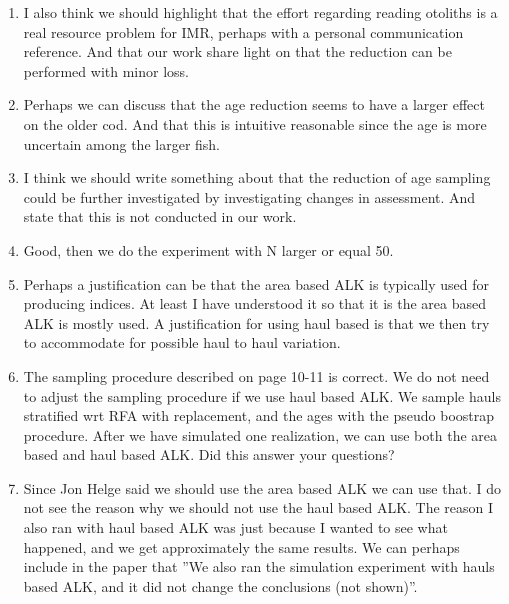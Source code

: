 \documentclass[a4paper 12pt]{article}
\numberwithin{equation}{section}
\begin{document}
\begin{enumerate}
\item I also think we should highlight that the effort regarding reading otoliths is a real resource problem for IMR, perhaps with a personal communication reference.  And that our work share light on that the reduction can be performed with minor loss.

\item Perhaps we can discuss that the age reduction seems to have a larger effect on the older cod. And that this is intuitive reasonable since the age is more uncertain among the larger fish.

\item I think we should write something about that the reduction of age sampling could be further investigated by investigating changes in assessment. And state that this is not conducted in our work. 

\item Good, then we do the experiment with N larger or equal 50.

\item Perhaps a justification can be that the area based ALK is typically used for producing indices. At least I have understood it so that it is the area based ALK is mostly used. A justification for using haul based is that we then try to accommodate for possible haul to haul variation.

\item The sampling procedure described on page 10-11 is correct. We do not need to adjust the sampling procedure if we use haul based ALK. We sample hauls stratified wrt RFA with replacement, and the ages with the pseudo boostrap procedure. After we have simulated one realization, we can use both the area based and haul based ALK. Did this answer your questions?

\item Since Jon Helge said we should use the area based ALK we can use that. I do not see the reason why we should not use the haul based ALK. The reason I also ran with haul based ALK was just because I wanted to see what happened, and we get approximately the same results. We can perhaps include in the paper that ”We also ran the simulation experiment with hauls based ALK, and it did not change the conclusions (not shown)”.


\end{enumerate}
\end{document}
